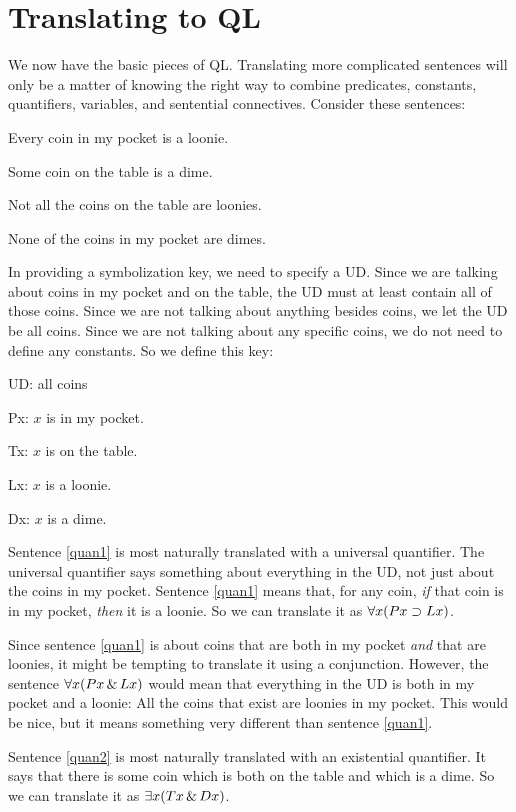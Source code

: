 \section{Translating to QL}
We now have the basic pieces of QL. Translating more complicated sentences will only be a matter of knowing the right way to combine predicates, constants, quantifiers, variables, and sentential connectives. Consider these sentences:
\begin{earg}
\item[\ex{quan1}] Every coin in my pocket is a loonie.
\item[\ex{quan2}] Some coin on the table is a dime.
\item[\ex{quan3}] Not all the coins on the table are loonies.
\item[\ex{quan4}] None of the coins in my pocket are dimes.
\end{earg}
In providing a symbolization key, we need to specify a UD. Since we are talking about coins in my pocket and on the table, the UD must at least contain all of those coins. Since we are not talking about anything besides coins, we let the UD be all coins. Since we are not talking about any specific coins, we do not need to define any constants. So we define this key:
\begin{ekey}
\item[UD:] all coins
\item[Px:] $x$ is in my pocket.
\item[Tx:] $x$ is on the table.
\item[Lx:] $x$ is a loonie.
\item[Dx:] $x$ is a dime.
\end{ekey}
Sentence \ref{quan1} is most naturally translated with a universal quantifier. The universal quantifier says something about everything in the UD, not just about the coins in my pocket. Sentence \ref{quan1} means that, for any coin, \emph{if} that coin is in my pocket, \emph{then} it is a loonie. So we can translate it as $\forall x(Px \supset Lx)$.

Since sentence \ref{quan1} is about coins that are both in my pocket \emph{and} that are loonies, it might be tempting to translate it using a conjunction. However, the sentence $\forall x(Px \,\&\, Lx)$ would mean that everything in the UD is both in my pocket and a loonie: All the coins that exist are loonies in my pocket. This would be nice, but it means something very different than sentence \ref{quan1}.

Sentence \ref{quan2} is most naturally translated with an existential quantifier. It says that there is some coin which is both on the table and which is a dime. So we can translate it as $\exists x(Tx \,\&\, Dx)$.

